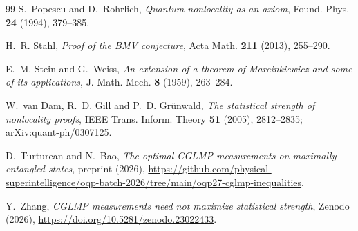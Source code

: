 \documentclass[11pt]{article}
\theoremstyle{remark}
\numberwithin{equation}{section}
\begin{document}
\begin{thebibliography}{99}
S.~Popescu and D.~Rohrlich, \emph{Quantum nonlocality as an axiom}, Found. Phys. \textbf{24} (1994), 379--385.

H.~R. Stahl, \emph{Proof of the BMV conjecture}, Acta Math. \textbf{211} (2013), 255--290.

E.~M. Stein and G.~Weiss, \emph{An extension of a theorem of Marcinkiewicz and some of its applications}, J. Math.
Mech. \textbf{8} (1959), 263--284.

W.~van Dam, R.~D. Gill and P.~D. Gr\"unwald, \emph{The statistical strength of nonlocality proofs}, IEEE Trans. Inform.
Theory \textbf{51} (2005), 2812--2835; arXiv:quant-ph/0307125.

D.~Turturean and N.~Bao, \emph{The optimal CGLMP measurements on maximally entangled states},
preprint (2026), \url{https://github.com/physical-superintelligence/oqp-batch-2026/tree/main/oqp27-cglmp-inequalities}.

Y.~Zhang, \emph{CGLMP measurements need not maximize statistical strength}, Zenodo (2026),
\url{https://doi.org/10.5281/zenodo.23022433}.

\end{thebibliography}
\end{document}
